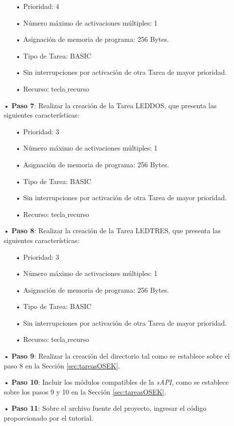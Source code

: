 \documentclass[12pt,letterpaper]{article}
\begin{document}
\begin{enumerate}
\begin{enumerate}
\item[•]Prioridad: 4
\item[•]Número máximo de activaciones múltiples: 1
\item[•]Asignación de memoria de programa: 256 Bytes.
\item[•]Tipo de Tarea: BASIC
\item[•]Sin interrupciones por activación de otra Tarea de mayor prioridad.
\item[•]Recurso: tecla$\_$recurso
\end{enumerate}
\item[•]\textbf{Paso 7}: Realizar la creación de la Tarea LEDDOS, que presenta las siguientes características:
\begin{enumerate}
\item[•]Prioridad: 3
\item[•]Número máximo de activaciones múltiples: 1
\item[•]Asignación de memoria de programa: 256 Bytes.
\item[•]Tipo de Tarea: BASIC
\item[•]Sin interrupciones por activación de otra Tarea de mayor prioridad.
\item[•]Recurso: tecla$\_$recurso
\end{enumerate}
\item[•]\textbf{Paso 8}: Realizar la creación de la Tarea LEDTRES, que presenta las siguientes características:
\begin{enumerate}
\item[•]Prioridad: 3
\item[•]Número máximo de activaciones múltiples: 1
\item[•]Asignación de memoria de programa: 256 Bytes.
\item[•]Tipo de Tarea: BASIC
\item[•]Sin interrupciones por activación de otra Tarea de mayor prioridad.
\item[•]Recurso: tecla$\_$recurso
\end{enumerate}
\item[•]\textbf{Paso 9}: Realizar la creación del directorio tal como se establece sobre el paso 8 en la Sección \ref{sec:tareasOSEK}.
\item[•]\textbf{Paso 10}: Incluir los módulos compatibles de la \textit{sAPI}, como se establece sobre los pasos 9 y 10 en la Sección \ref{sec:tareasOSEK}.
\item[•]\textbf{Paso 11}: Sobre el archivo fuente del proyecto, ingresar el código proporcionado por el tutorial.
\end{enumerate}
\end{document}
